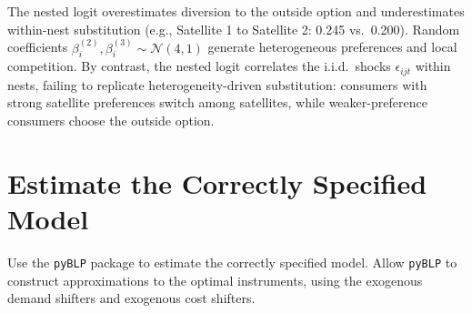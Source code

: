 \documentclass[english,11pt]{article}
\begin{document}
\noindent The nested logit overestimates diversion to the outside option and underestimates within-nest substitution (e.g., Satellite 1 to Satellite 2: 0.245 vs.\ 0.200). Random coefficients $\beta_i^{(2)}, \beta_i^{(3)} \sim \mathcal{N}(4,1)$ generate heterogeneous preferences and local competition. By contrast, the nested logit correlates the i.i.d.\ shocks $\epsilon_{ijt}$ within nests, failing to replicate heterogeneity-driven substitution: consumers with strong satellite preferences switch among satellites, while weaker-preference consumers choose the outside option.


\section{Estimate the Correctly Specified Model}

Use the \texttt{pyBLP} package to estimate the correctly specified model. Allow
\texttt{pyBLP} to construct approximations to the optimal instruments, using the
exogenous demand shifters and exogenous cost shifters.
\end{document}
